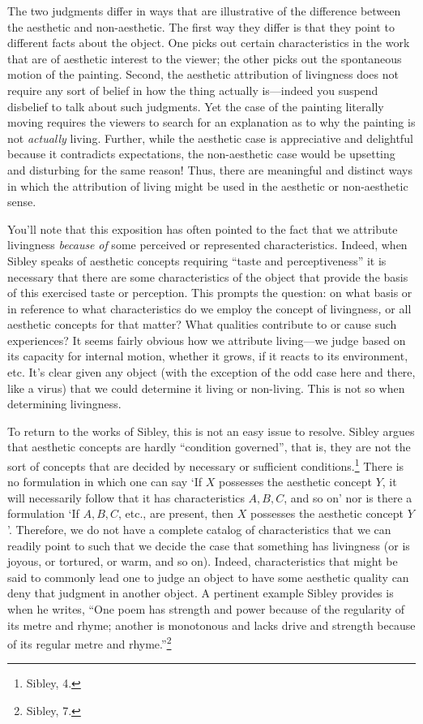 The two judgments differ in ways that are illustrative of the difference
between the aesthetic and non-aesthetic. The first way they differ is
that they point to different facts about the object. One picks out
certain characteristics in the work that are of aesthetic interest to
the viewer; the other picks out the spontaneous motion of the painting.
Second, the aesthetic attribution of livingness does not require any
sort of belief in how the thing actually is---indeed you suspend
disbelief to talk about such judgments. Yet the case of the painting
literally moving requires the viewers to search for an explanation as to
why the painting is not \emph{actually} living. Further, while the
aesthetic case is appreciative and delightful because it contradicts
expectations, the non-aesthetic case would be upsetting and disturbing
for the same reason! Thus, there are meaningful and distinct ways in
which the attribution of living might be used in the aesthetic or
non-aesthetic sense.

You'll note that this exposition has often pointed to the fact that we
attribute livingness \emph{because} \emph{of} some perceived or
represented characteristics. Indeed, when Sibley speaks of aesthetic
concepts requiring ``taste and perceptiveness'' it is necessary that
there are some characteristics of the object that provide the basis of
this exercised taste or perception. This prompts the question: on what
basis or in reference to what characteristics do we employ the concept
of livingness\emph{,} or all aesthetic concepts for that matter? What
qualities contribute to or cause such experiences? It seems fairly
obvious how we attribute living---we judge based on its capacity for
internal motion, whether it grows, if it reacts to its environment, etc.
It's clear given any object (with the exception of the odd case here and
there, like a virus) that we could determine it living or non-living.
This is not so when determining livingness.

To return to the works of Sibley, this is not an easy issue to resolve.
Sibley argues that aesthetic concepts are hardly ``condition governed'',
that is, they are not the sort of concepts that are decided by necessary
or sufficient conditions.\footnote{Sibley, 4.} There is no formulation
in which one can say `If $X$ possesses the aesthetic concept $Y$, it will
necessarily follow that it has characteristics $A, B, C$, and so on' nor
is there a formulation `If $A, B, C$, etc., are present, then $X$ possesses
the aesthetic concept $Y$'. Therefore, we do not have a complete catalog
of characteristics that we can readily point to such that we decide the
case that something has livingness (or is joyous, or tortured, or warm,
and so on). Indeed, characteristics that might be said to commonly lead
one to judge an object to have some aesthetic quality can deny that
judgment in another object. A pertinent example Sibley provides is when
he writes, ``One poem has strength and power because of the regularity
of its metre and rhyme; another is monotonous and lacks drive and
strength because of its regular metre and rhyme.''\footnote{Sibley, 7.}

